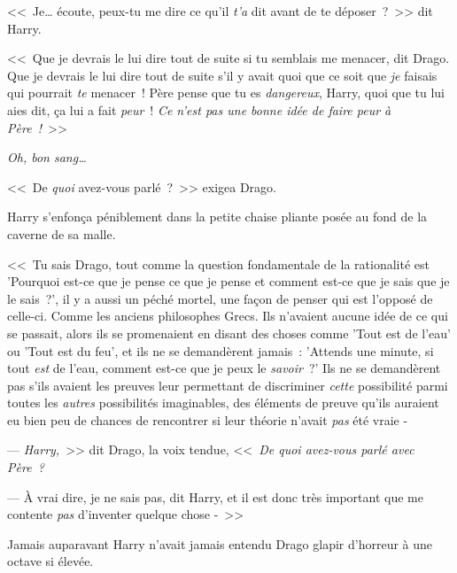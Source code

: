 <<~Je… écoute, peux-tu me dire ce qu'il \emph{t'a} dit avant de te déposer~?~>> dit Harry.

<<~Que je devrais le lui dire tout de suite si tu semblais me menacer, dit Drago. Que je devrais le lui dire tout de suite s'il y avait quoi que ce soit que \emph{je} faisais qui pourrait \emph{te} menacer~! Père pense que tu es \emph{dangereux}, Harry, quoi que tu lui aies dit, ça lui a fait \emph{peur}~! \emph{Ce n'est pas une bonne idée de faire peur à Père~!}~>>

\emph{Oh, bon sang…}

<<~De \emph{quoi} avez-vous parlé~?~>> exigea Drago.

Harry s'enfonça péniblement dans la petite chaise pliante posée au fond de la caverne de sa malle.

<<~Tu sais Drago, tout comme la question fondamentale de la rationalité est 'Pourquoi est-ce que je pense ce que je pense et comment est-ce que je sais que je le sais~?', il y a aussi un péché mortel, une façon de penser qui est l'opposé de celle-ci. Comme les anciens philosophes Grecs. Ils n'avaient aucune idée de ce qui se passait, alors ils se promenaient en disant des choses comme 'Tout est de l'eau' ou 'Tout est du feu', et ils ne se demandèrent jamais~: 'Attends une minute, si tout \emph{est} de l'eau, comment est-ce que je peux le \emph{savoir}~?' Ils ne se demandèrent pas s'ils avaient les preuves leur permettant de discriminer \emph{cette} possibilité parmi toutes les \emph{autres} possibilités imaginables, des éléments de preuve qu'ils auraient eu bien peu de chances de rencontrer si leur théorie n'avait \emph{pas} été vraie -

--- \emph{Harry,}~>> dit Drago, la voix tendue, <<~\emph{De quoi avez-vous parlé avec Père~?}

--- À vrai dire, je ne sais pas, dit Harry, et il est donc très important que me contente \emph{pas} d'inventer quelque chose -~>>

Jamais auparavant Harry n'avait jamais entendu Drago glapir d'horreur à une octave si élevée. 

